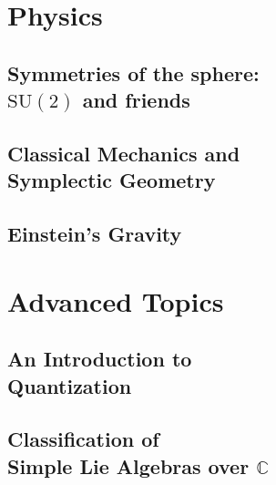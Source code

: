 \documentclass[12pt, twoside, openany]{book}
\begin{document}







\part{Physics}\thispagestyle{empty}

\chapter[Symmetries of the sphere: $\mathrm{SU}(2)$ and friends]{Symmetries of the sphere: \\$\mathrm{SU}(2)$ and friends}

\chapter[Classical Mechanics and Symplectic Geometry]{Classical Mechanics and\\ Symplectic Geometry}\label{ch:Symplectic}

\chapter{Einstein's Gravity}\label{ch:GR}

\part{Advanced Topics}\thispagestyle{empty}

\chapter[An Introduction to Quantization]{An Introduction to \\Quantization}

\chapter[Classification of Simple Lie Algebras over $\mathbb C$]{Classification of\\ Simple Lie Algebras over $\mathbb{C}$}
\end{document}
